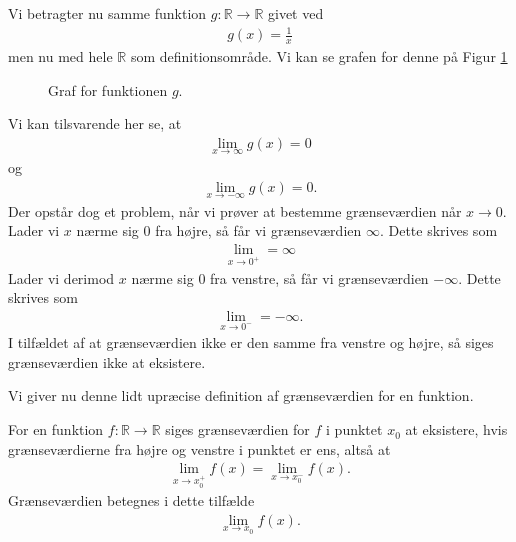 \begin{exa}
	Vi betragter nu samme funktion $g: \mathbb{R} \to \mathbb{R}$ givet ved
	\begin{align*}
		g(x) = \frac{1}{x}
	\end{align*}	 
	men nu med hele $\mathbb{R}$ som	definitionsområde. Vi kan se grafen for denne på Figur \ref{fig:grænse2}
	\begin{figure}[H]
	\centering
	\caption{Graf for funktionen $g$.}
	\label{fig:grænse2}
	\end{figure}
	Vi kan tilsvarende her se, at 
	\begin{align*}
		\lim_{x \to \infty} g(x) = 0
	\end{align*}
	og 
	\begin{align*}
		\lim_{x \to -\infty} g(x) = 0.
	\end{align*}
	Der opstår dog et problem, når vi prøver at bestemme grænseværdien når $x \to 0$. Lader vi $x$ nærme sig 0
	fra højre, så får vi grænseværdien $\infty$. 
	Dette skrives som 
	\begin{align*}
		\lim_{x \to 0^+} = \infty 	
	\end{align*}		
	 Lader vi derimod $x$ nærme sig 0 fra venstre, så får
	vi grænseværdien $-\infty$. Dette skrives som
	\begin{align*}
		\lim_{x \to 0^{-}} = -\infty.
	\end{align*}
	I tilfældet af at grænseværdien ikke er den samme fra venstre og højre, så siges grænseværdien ikke at 
	eksistere.
\end{exa}
Vi giver nu denne lidt upræcise definition af grænseværdien for en funktion.
\begin{defn}[Grænseværdi]
	For en funktion $f:\mathbb{R} \to \mathbb{R}$ siges grænseværdien for $f$ i punktet $x_0$ at eksistere, 
	hvis grænseværdierne fra højre og venstre i punktet er ens, altså at
	\begin{align*}
		\lim_{x \to x_0^+}f(x) = \lim_{x \to x_0^-}f(x).
	\end{align*}
	Grænseværdien betegnes i dette tilfælde
	\begin{align*}
		\lim_{x \to x_0}f(x).
	\end{align*}
\end{defn}
